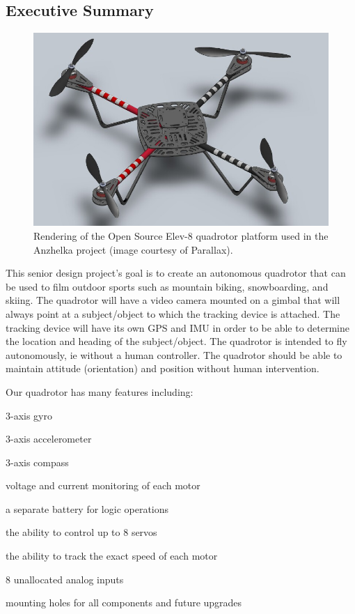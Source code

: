 \documentclass{article}
\numberwithin{equation}{section} %
\begin{document}
\subsection{Executive Summary}
\begin{figure}[h!]
  \centering
	\includegraphics[scale=.6]{elev_8_rendering.JPG}
  \caption{Rendering of the Open Source Elev-8 quadrotor platform used in the Anzhelka project (image courtesy of Parallax).}
\end{figure}  

This senior design project's goal is to create an autonomous quadrotor that can be used to film outdoor sports such as mountain biking, snowboarding, and skiing. The quadrotor will have a video camera mounted on a gimbal that will always point at a subject/object to which the tracking device is attached. The tracking device will have its own GPS and IMU in order to be able to determine the location and heading of the subject/object. The quadrotor is intended to fly autonomously, ie without a human controller. The quadrotor should be able to maintain attitude (orientation) and position without human intervention.

Our quadrotor has many features including: 
\begin{list}{*}{}
	\item 3-axis gyro
	\item 3-axis accelerometer
	\item 3-axis compass
	\item voltage and current monitoring of each motor
	\item a separate battery for logic operations
	\item the ability to control up to 8 servos
	\item the ability to track the exact speed of each motor
	\item 8 unallocated analog inputs
	\item mounting holes for all components and future upgrades
\end{list}
\end{document}
